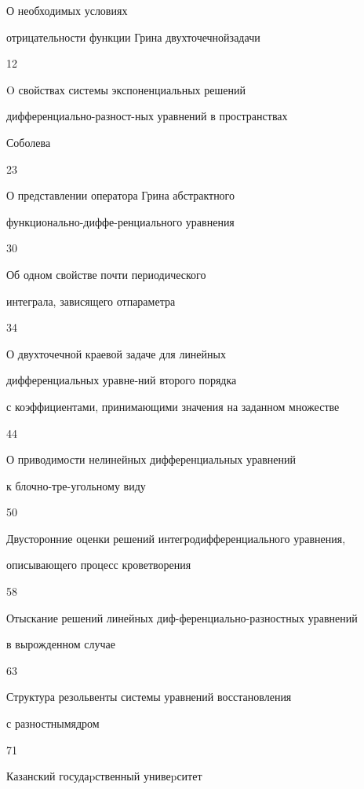 

{О необходимых условиях


отрицательности функции Грина двухточечной\newline задачи}{12}




{O свойствах системы экспоненциальных решений 


дифференциально-разност-\newline ных уравнений в пространствах 


Соболева}{23}




{О представлении оператора Грина абстрактного 


функционально-диффе-\newline ренциального уравнения}{30}




{Об одном свойстве почти периодического


интеграла, зависящего от\newline параметра}{34}




{О двухточечной краевой задаче для линейных 


дифференциальных уравне-\newline ний второго порядка 


с коэффициентами, принимающими значения на заданном множестве}{44}




{О приводимости нелинейных дифференциальных уравнений


к блочно-тре-\newline угольному виду}{50}




{Двусторонние оценки решений интегродифференциального уравнения, \newline


описывающего процесс кроветворения}{58}




{Отыскание решений линейных диф-\newline ференциально-разностных уравнений 


в вырожденном случае}{63}




{Структура резольвенты системы уравнений восстановления


с разностным\newline ядром}{71}





\vfill


\noindent\raisebox{2pt}{\copyright} Казанский госудаpственный унивеpситет





